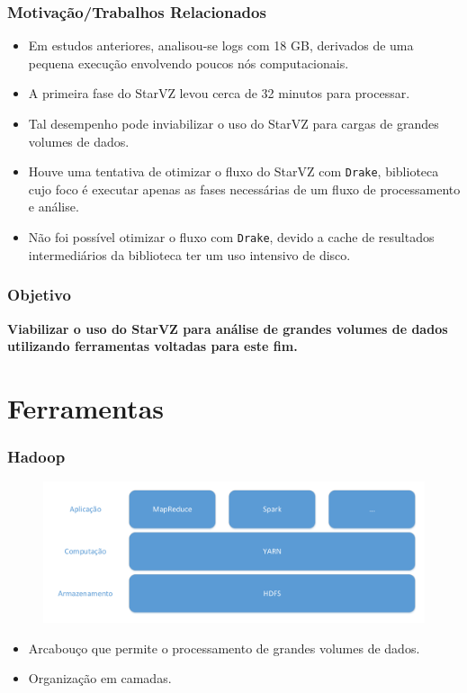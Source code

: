 \documentclass{beamer}
\begin{document}
\begin{frame}
\frametitle{Motivação/Trabalhos Relacionados}
  \begin{itemize}
   \item Em estudos anteriores, analisou-se logs com 18 GB, derivados de uma 
pequena execução envolvendo poucos nós computacionais.
   \item A primeira fase do StarVZ levou cerca de 32 minutos para processar.
   \item Tal desempenho pode inviabilizar o uso do StarVZ para cargas de 
grandes volumes de dados.
   \item Houve uma tentativa de otimizar o fluxo do StarVZ com 
\texttt{Drake}, biblioteca cujo foco é executar apenas as fases necessárias de 
um fluxo de processamento e análise.
  \item Não foi possível otimizar o fluxo com \texttt{Drake}, devido a cache de 
resultados intermediários da biblioteca ter um uso intensivo de disco.
  \end{itemize}
\end{frame}

\begin{frame}
 \frametitle{Objetivo}
\textbf{Viabilizar o uso do StarVZ para análise de grandes volumes de dados 
utilizando ferramentas voltadas para este fim.}
\end{frame}


\section{Ferramentas}

\begin{frame}
 \frametitle{Hadoop}
 \begin{figure}[H]
  \centerline{\includegraphics[width=1\textwidth]{./img/hadoop-layers.pdf}}
 \end{figure}
  \begin{itemize}
  \item Arcabouço que permite o processamento de grandes volumes de dados.
  \item Organização em camadas.
  \end{itemize}
\end{frame}
\end{document}

